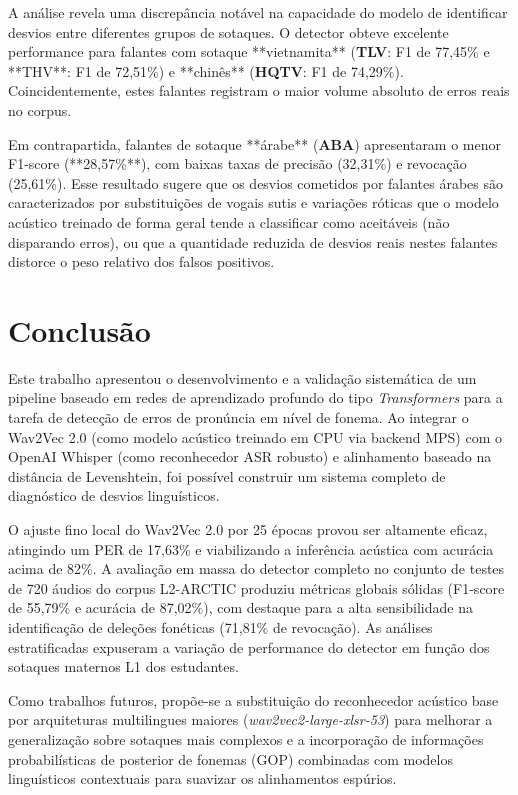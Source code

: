 \documentclass[12pt]{article}
\begin{document}
A análise revela uma discrepância notável na capacidade do modelo de identificar desvios entre diferentes grupos de sotaques. O detector obteve excelente performance para falantes com sotaque **vietnamita** (\textbf{TLV}: F1 de 77,45\% e **THV**: F1 de 72,51\%) e **chinês** (\textbf{HQTV}: F1 de 74,29\%). Coincidentemente, estes falantes registram o maior volume absoluto de erros reais no corpus. 

Em contrapartida, falantes de sotaque **árabe** (\textbf{ABA}) apresentaram o menor F1-score (**28,57\%**), com baixas taxas de precisão (32,31\%) e revocação (25,61\%). Esse resultado sugere que os desvios cometidos por falantes árabes são caracterizados por substituições de vogais sutis e variações róticas que o modelo acústico treinado de forma geral tende a classificar como aceitáveis (não disparando erros), ou que a quantidade reduzida de desvios reais nestes falantes distorce o peso relativo dos falsos positivos.

\section{Conclusão}
Este trabalho apresentou o desenvolvimento e a validação sistemática de um pipeline baseado em redes de aprendizado profundo do tipo \textit{Transformers} para a tarefa de detecção de erros de pronúncia em nível de fonema. Ao integrar o Wav2Vec 2.0 (como modelo acústico treinado em CPU via backend MPS) com o OpenAI Whisper (como reconhecedor ASR robusto) e alinhamento baseado na distância de Levenshtein, foi possível construir um sistema completo de diagnóstico de desvios linguísticos.

O ajuste fino local do Wav2Vec 2.0 por 25 épocas provou ser altamente eficaz, atingindo um PER de 17,63\% e viabilizando a inferência acústica com acurácia acima de 82\%. A avaliação em massa do detector completo no conjunto de testes de 720 áudios do corpus L2-ARCTIC produziu métricas globais sólidas (F1-score de 55,79\% e acurácia de 87,02\%), com destaque para a alta sensibilidade na identificação de deleções fonéticas (71,81\% de revocação). As análises estratificadas expuseram a variação de performance do detector em função dos sotaques maternos L1 dos estudantes.

Como trabalhos futuros, propõe-se a substituição do reconhecedor acústico base por arquiteturas multilingues maiores (\textit{wav2vec2-large-xlsr-53}) para melhorar a generalização sobre sotaques mais complexos e a incorporação de informações probabilísticas de posterior de fonemas (GOP) combinadas com modelos linguísticos contextuais para suavizar os alinhamentos espúrios.
\end{document}
